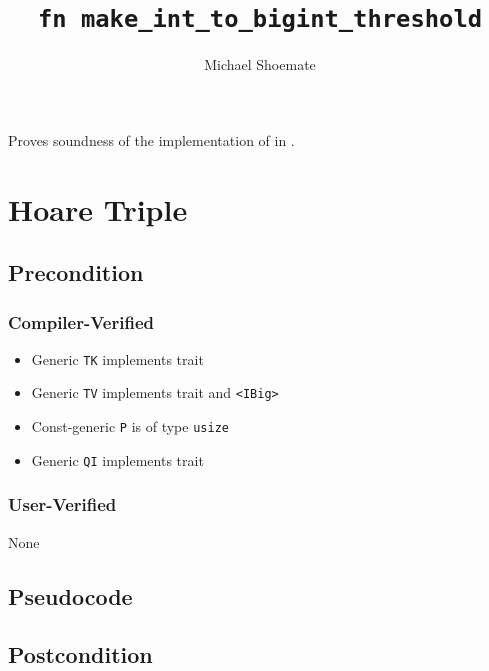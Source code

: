\documentclass{article}
\title{\texttt{fn make\_int\_to\_bigint\_threshold}}
\author{Michael Shoemate}
\date{}
\begin{document}
\maketitle

\contrib
Proves soundness of the implementation of  in .

\section{Hoare Triple}
\subsection*{Precondition}
\subsubsection*{Compiler-Verified}

\begin{itemize}
    \item Generic \texttt{TK} implements trait 
    \item Generic \texttt{TV} implements trait  and \texttt{<IBig>}
    \item Const-generic \texttt{P} is of type \texttt{usize}
    \item Generic \texttt{QI} implements trait 
\end{itemize}

\subsubsection*{User-Verified}
None

\subsection*{Pseudocode}


\subsection*{Postcondition}
\begin{theorem}
\end{theorem}
\end{document}
